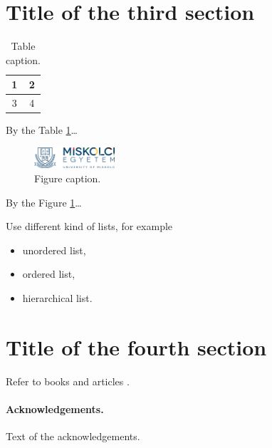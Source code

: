 \documentclass[a4paper,12pt]{article}
\begin{document}
\section{Title of the third section}

\begin{table}[!ht] %
  \centering
  \begin{tabular}{|c|c|}
    \hline
    1 & 2 \\
    \hline
    3 & 4 \\
    \hline
  \end{tabular}
  \caption{Table caption.}\label{table:Key3}
\end{table}

By the Table \ref{table:Key3}\dots

\begin{figure}[!ht] %
  \centering
  \includegraphics[width=3cm]{ME_Logo.png}
  \caption{Figure caption.}\label{figure:Key4}
\end{figure}

By the Figure \ref{figure:Key4}\dots

Use different kind of lists, for example
\begin{itemize}
\item unordered list,
\item ordered list,
\item hierarchical list.
\end{itemize}

\section{Title of the fourth section}%

Refer to books \cite{erdos2013} and articles \cite{aczel1983}.

\paragraph{Acknowledgements.} Text of the acknowledgements.



\end{document}
